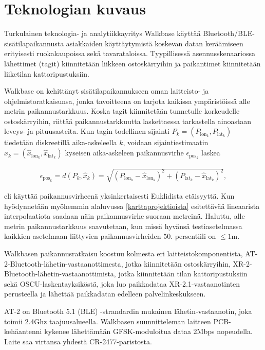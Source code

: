 \documentclass[
  12pt,
  a4paper, twoside]{book}
\begin{document}
\section{Teknologian kuvaus}

Turkulainen teknologia- ja analytiikkayritys Walkbase käyttää Bluetooth/BLE-sisätilapaikannusta asiakkaiden käyttäytymistä koskevan datan keräämiseen erityisesti ruokakaupoissa sekä tavarataloissa. Tyypillisessä asennusskenaariossa lähettimet (tagit) kiinnitetään liikkeen ostoskärryihin ja paikantimet kiinnitetään liiketilan kattoripustuksiin.

Walkbase on kehittänyt sisätilapaikannukseen oman laitteisto- ja ohjelmistoratkaisunsa, jonka tavoitteena on tarjota kaikissa ympäristöissä alle metrin paikannustarkkuus. Koska tagit kiinnitetään tunnetulle korkeudelle ostoskärryihin, riittää paikannustarkkuutta laskettaessa tarkastella ainoastaan leveys- ja pituusasteita. Kun tagin todellinen sijainti \(P_k=(P_{\text{lon}_k}, P_{\text{lat}_k})\) tiedetään diskreetillä aika-askeleella \(k\), voidaan sijaintiestimaatin \(\hat{x}_k=(\hat{x}_{\text{lon}_k}, \hat{x}_{\text{lat}_k})\) kyseisen aika-askeleen paikannusvirhe \(\epsilon_{\text{pos}_k}\) laskea

\begin{align}\label{paikannusvirhe}
\epsilon_{\text{pos}_k} = d(P_k,\hat{x}_k) = \sqrt{(P_{\text{lon}_k}-\hat{x}_{\text{lon}_k})^2+(P_{\text{lat}_k}-\hat{x}_{\text{lat}_k})^2}
,\end{align}

\noindent eli käyttää paikannusvirheenä yksinkertaisesti Euklidista etäisyyttä. Kun hyödynnetään myöhemmin alaluvussa \ref{karttaprojektioista} esitettävää lineaarista interpolaatiota saadaan näin paikannusvirhe suoraan metreinä. Haluttu, alle metrin paikannustarkkuus saavutetaan, kun missä hyvänsä testiasetelmassa kaikkien asetelmaan liittyvien paikannusvirheiden \(50.\) persentiili on \(\leq1\)m.

Walkbasen paikannusratkaisu koostuu kolmesta eri laitteistokomponentista, AT-2-Bluetooth-lähetin-vastaanottimesta, jotka kiinnitetään ostoskärryihin, XR-2-Bluetooth-lähetin-vastaanottimista, jotka kiinnitetään tilan kattoripustuksiin sekä OSCU-laskentayksiköstä, joka luo paikkadataa XR-2.1-vastaanotinten perusteella ja lähettää paikkadatan edelleen palvelinkeskukseen.

AT-2 on Bluetooth 5.1 (BLE) -strandardin mukainen lähetin-vastaanotin, joka toimii 2.4Ghz taajuusalueella. Walkbasen suunnitteleman laitteen PCB-kehäantenni kykenee lähettämään GFSK-moduloitua dataa 2Mbps nopeudella. Laite saa virtansa yhdestä CR-2477-paristosta.
\end{document}
